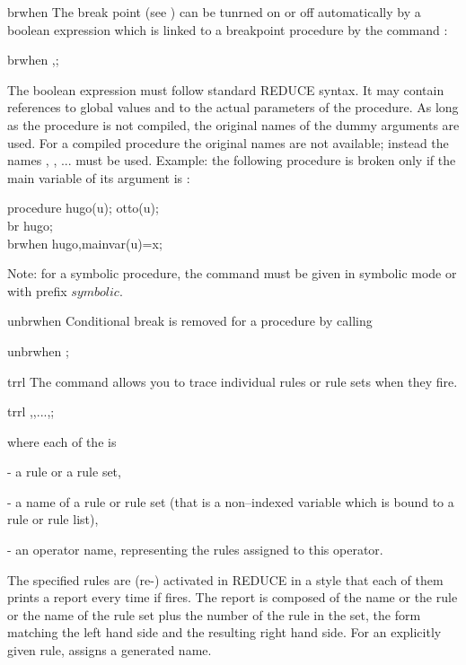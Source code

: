 \begin{Operator}{brwhen}
The break point (see )
 can be tunrned on or off automatically by
a boolean expression which is linked to a breakpoint procedure
by the command :
\begin{Syntax}
   brwhen ,;
\end{Syntax}
The boolean expression must follow
standard REDUCE syntax. It may contain references
to global values and to
the actual parameters of the procedure. As long as the
procedure is not compiled, the original names of the dummy arguments
are used. For a compiled procedure the  original names 
are not available; instead the names , , ...
must be used. Example: the following procedure is broken 
only if the main variable of its argument is :
\begin{Examples}
    procedure hugo(u); otto(u);\\
    br hugo;\\
    brwhen hugo,mainvar(u)=x;\\
\end{Examples}
Note: for a symbolic procedure, the  command
must be given in symbolic mode or with prefix $symbolic$.

\end{Operator}

\begin{Operator}{unbrwhen}
Conditional break is removed for a procedure by calling
\begin{Syntax}
   unbrwhen ;
\end{Syntax}
\end{Operator}


\begin{Operator}{trrl}
The command  allows you to trace individual rules
or rule sets when they fire.
\begin{Syntax}
   trrl ,,...,;
\end{Syntax}
where each of the  is

- a rule or a rule set,

- a name of a rule or rule set (that is a non--indexed variable which
      is bound to a rule or rule list),

- an operator name, representing the rules assigned to this
      operator.

The specified rules are (re-) activated in REDUCE in
a style that each of them prints a report every time if fires.
The report is composed of the name or the rule or the 
name of the rule set plus the number of the rule in the set,
the form matching the left hand side  and the 
resulting right hand side. 
For an explicitly given rule,  assigns a generated name.
\end{Operator}

